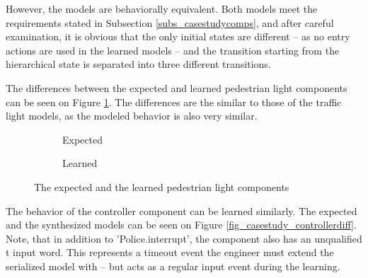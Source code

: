 However, the models are behaviorally equivalent. Both models meet the requirements stated in Subsection \ref{subs_casestudycomps}, and after careful examination, it is obvious that the only initial states are different -- as no entry actions are used in the learned models -- and the transition starting from the hierarchical state is separated into three different transitions.

The differences between the expected and learned pedestrian light components can be seen on Figure \ref{fig_casestudy_pedestrianlightdiff}. The differences are the similar to those of the traffic light models, as the modeled behavior is also very similar. 

\begin{figure}[!ht] 
	\centering
	\begin{subfigure}[b]{0.9\textwidth}
		\centering
		\caption{Expected}
	\end{subfigure}
	\hfill
	\begin{subfigure}[b]{0.9\textwidth}
		\centering
		\caption{Learned}	
	\end{subfigure}
	\caption{The expected and the learned pedestrian light components}
	\label{fig_casestudy_pedestrianlightdiff}
\end{figure}

The behavior of the controller component can be learned similarly. The expected and the synthesized models can be seen on Figure \ref{fig_casestudy_controllerdiff}. Note, that in addition to '{\selectfont Police.interrupt}', the component also has an unqualified t input word. This represents a timeout event the engineer must extend the serialized model with -- but acts as a regular input event during the learning. 


